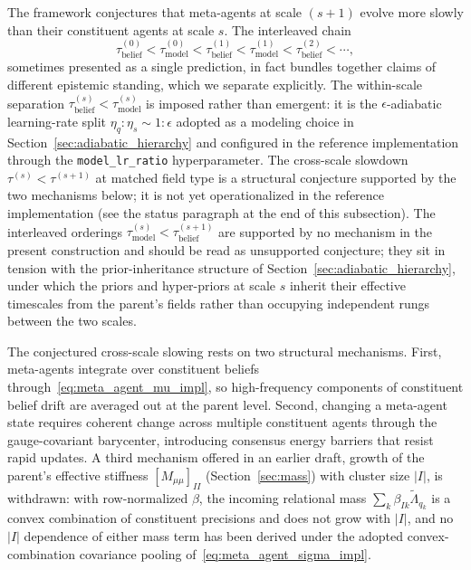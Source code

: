 \documentclass[11pt]{article}
\begin{document}
The framework conjectures that meta-agents at scale $(s+1)$ evolve more slowly than their constituent agents at scale $s$. The interleaved chain
\begin{equation}
\tau_{\text{belief}}^{(0)} < \tau_{\text{model}}^{(0)} < \tau_{\text{belief}}^{(1)} < \tau_{\text{model}}^{(1)} < \tau_{\text{belief}}^{(2)} < \cdots,
\end{equation}
sometimes presented as a single prediction, in fact bundles together claims of different epistemic standing, which we separate explicitly. The within-scale separation $\tau_{\text{belief}}^{(s)} < \tau_{\text{model}}^{(s)}$ is imposed rather than emergent: it is the $\epsilon$-adiabatic learning-rate split $\eta_q : \eta_s \sim 1 : \epsilon$ adopted as a modeling choice in Section~\ref{sec:adiabatic_hierarchy} and configured in the reference implementation through the \texttt{model\_lr\_ratio} hyperparameter. The cross-scale slowdown $\tau^{(s)} < \tau^{(s+1)}$ at matched field type is a structural conjecture supported by the two mechanisms below; it is not yet operationalized in the reference implementation (see the status paragraph at the end of this subsection). The interleaved orderings $\tau_{\text{model}}^{(s)} < \tau_{\text{belief}}^{(s+1)}$ are supported by no mechanism in the present construction and should be read as unsupported conjecture; they sit in tension with the prior-inheritance structure of Section~\ref{sec:adiabatic_hierarchy}, under which the priors and hyper-priors at scale $s$ inherit their effective timescales from the parent's fields rather than occupying independent rungs between the two scales.

The conjectured cross-scale slowing rests on two structural mechanisms. First, meta-agents integrate over constituent beliefs through~\eqref{eq:meta_agent_mu_impl}, so high-frequency components of constituent belief drift are averaged out at the parent level. Second, changing a meta-agent state requires coherent change across multiple constituent agents through the gauge-covariant barycenter, introducing consensus energy barriers that resist rapid updates. A third mechanism offered in an earlier draft, growth of the parent's effective stiffness $[M_{\mu\mu}]_{II}$ (Section~\ref{sec:mass}) with cluster size $|I|$, is withdrawn: with row-normalized $\beta$, the incoming relational mass $\sum_k \beta_{Ik}\tilde\Lambda_{q_k}$ is a convex combination of constituent precisions and does not grow with $|I|$, and no $|I|$ dependence of either mass term has been derived under the adopted convex-combination covariance pooling of~\eqref{eq:meta_agent_sigma_impl}.
\end{document}
